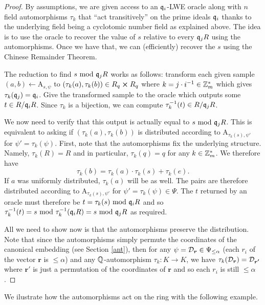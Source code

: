 \begin{proof}
	By assumptions, we are given access to an $\mathfrak{q}_i$-LWE oracle along with $n$ field automorphisms $\tau_k$ that ``act transitively'' on the prime ideals $\mathfrak{q}_i$ thanks to the underlying field being a cyclotomic number field as explained above. The idea is to use the oracle to recover the value of $s$ relative to every $\mathfrak{q}_j R$ using the automorphisms. Once we have that, we can (efficiently) recover the $s$ using the Chinese Remainder Theorem. 

	The reduction to find $s \text{ mod } \mathfrak{q}_j R$ works as follows: transform each given sample $(a,b) \leftarrow \text{A}_{s, \psi}$ to $(\tau_k(a), \tau_k(b)) \in R_q \cross R_q$ where $k = j \cdot i^{-1} \in \mathbb{Z}^*_m$ which gives $\tau_k(\mathfrak{q}_j) = \mathfrak{q}_i$. Give the transformed sample to the oracle which outputs some $t \in R / \mathfrak{q}_i R$. Since $\tau_k$ is a bijection, we can compute $\tau^{-1}_k(t) \in R / \mathfrak{q}_j R$.

	We now need to verify that this output is actually equal to $s \text{ mod } \mathfrak{q}_j R$. This is equivalent to asking if $(\tau_k(a), \tau_k(b))$ is distributed according to A$_{\tau_k(s), \psi '}$ for $\psi ' = \tau_k(\psi)$. First, note that the automorphisms fix the underlying structure. Namely, $\tau_k(R) = R$ and in particular, $\tau_k(q) = q$ for any $k \in \mathbb{Z}_m^*$. We therefore have
	\[ \tau_k(b) = \tau_k(a)\cdot \tau_k(s) + \tau_k(e).\]
	If $a$ was uniformly distributed, $\tau_k(a)$ will be as well. The pairs are therefore distributed according to A$_{\tau_k(s), \psi '}$ for $\psi ' = \tau_k(\psi) \in \Psi$. The $t$ returned by an oracle must therefore be $t = \tau_k(s) \text{ mod } \mathfrak{q}_i R$ and so $\tau_k^{-1}(t) = s \text{ mod } \tau_k^{-1}(\mathfrak{q}_i R) = s \text{ mod } \mathfrak{q}_j R$ as required. 

	All we need to show now is that the automorphisms preserve the distribution. Note that since the automorphisms simply permute the coordinates of the canonical embedding (see Section \ref{ant}), then for any $\psi = \mathcal{D}_{\boldsymbol{r}} \in \Psi_{\leq \alpha}$ (each $r_i$ of the vector $\bm{r}$ is $\leq \alpha$) and any $\mathbb{Q}$-automorphism $\tau_k: K \rightarrow K$, we have $\tau_k(\mathcal{D}_{\boldsymbol{r}}) = \mathcal{D}_{\boldsymbol{r'}}$ where $\bm{r'}$ is just a permutation of the coordinates of $\bm{r}$ and so each $r_i$ is still $\leq \alpha$.

\end{proof}
We ilustrate how the automorphisms act on the ring with the following example.
